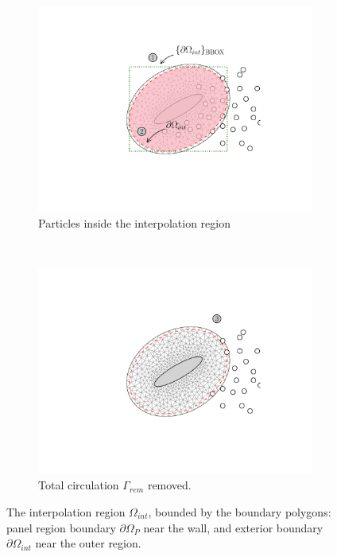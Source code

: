 	\begin{figure}[h]
     \centering
     \begin{subfigure}[t]{0.49\textwidth}
             \includegraphics[trim=4.37cm 1.58cm 3.86cm 1.58cm, clip, width=\linewidth]{./figures/hybrid/interpolation/ellipse/interpRegion.pdf}
             \caption{Particles inside the interpolation region}
             \label{fig:region}
     \end{subfigure}%
     ~ %
     \begin{subfigure}[t]{0.49\textwidth}
             \includegraphics[trim=4.37cm 1.58cm 3.86cm 1.58cm, clip, width=\linewidth]{./figures/hybrid/interpolation/ellipse/particleRemoved.pdf}
             \caption{Total circulation $\Gamma_{rem}$ removed.}
             \label{fig:removed}
     \end{subfigure}

     \caption{The interpolation region $\Omega_{int}$, bounded by the boundary polygons: panel region boundary $\partial \Omega_P$ near the wall, and exterior boundary $\partial \Omega_{int}$ near the outer region.}
     \label{fig:interpRegionEllipse}
	\end{figure}	

